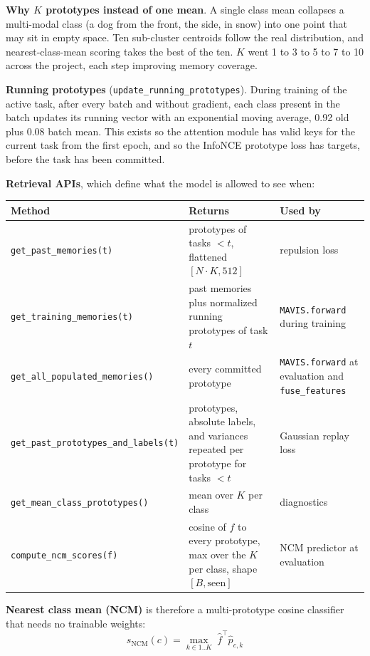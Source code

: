 \documentclass[11pt,a4paper]{article}
\newcommand{\code}[1]{\texttt{#1}}
\begin{document}
\textbf{Why $K$ prototypes instead of one mean}. A single class mean collapses a multi-modal class (a dog from the front, the side, in snow) into one point that may sit in empty space. Ten sub-cluster centroids follow the real distribution, and nearest-class-mean scoring takes the best of the ten. $K$ went 1 to 3 to 5 to 7 to 10 across the project, each step improving memory coverage.

\textbf{Running prototypes} (\code{update\_running\_prototypes}). During training of the active task, after every batch and without gradient, each class present in the batch updates its running vector with an exponential moving average, 0.92 old plus 0.08 batch mean. This exists so the attention module has valid keys for the current task from the first epoch, and so the InfoNCE prototype loss has targets, before the task has been committed.

\textbf{Retrieval APIs}, which define what the model is allowed to see when:

\begin{tabularx}{\textwidth}{L{4.6cm} Y L{3.6cm}}
\toprule
Method & Returns & Used by \\
\midrule
\code{get\_past\_memories(t)} & prototypes of tasks $< t$, flattened $[N \cdot K, 512]$ & repulsion loss \\
\code{get\_training\_memories(t)} & past memories plus normalized running prototypes of task $t$ & \code{MAVIS.forward} during training \\
\code{get\_all\_populated\_memories()} & every committed prototype & \code{MAVIS.forward} at evaluation and \code{fuse\_features} \\
\code{get\_past\_prototypes\_and\_labels(t)} & prototypes, absolute labels, and variances repeated per prototype for tasks $< t$ & Gaussian replay loss \\
\code{get\_mean\_class\_prototypes()} & mean over $K$ per class & diagnostics \\
\code{compute\_ncm\_scores(f)} & cosine of $f$ to every prototype, max over the $K$ per class, shape $[B, \mathrm{seen}]$ & NCM predictor at evaluation \\
\bottomrule
\end{tabularx}

\textbf{Nearest class mean (NCM)} is therefore a multi-prototype cosine classifier that needs no trainable weights:
\begin{equation}
s_{\mathrm{NCM}}(c) = \max_{k \in 1..K} \; \hat{f}^{\top} \hat{p}_{c,k}
\end{equation}
\end{document}
